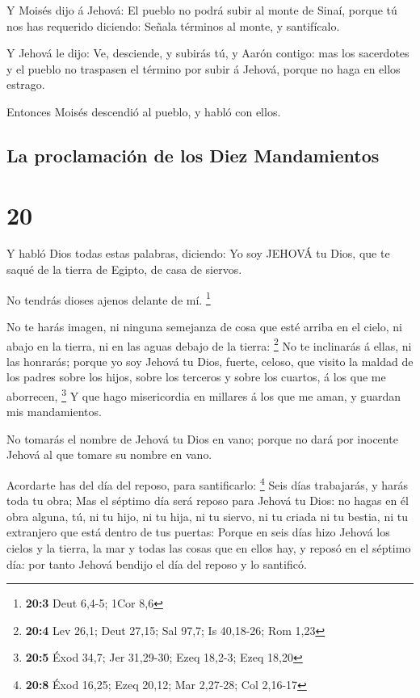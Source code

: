  Y Moisés dijo á Jehová: El pueblo no podrá subir al
monte de Sinaí, porque tú nos has requerido diciendo: Señala términos al
monte, y santifícalo.

 Y Jehová le dijo: Ve, desciende, y subirás tú, y Aarón
contigo: mas los sacerdotes y el pueblo no traspasen el término por
subir á Jehová, porque no haga en ellos estrago.

 Entonces Moisés descendió al pueblo, y habló con ellos.

\hypertarget{la-proclamaciuxf3n-de-los-diez-mandamientos}{%
\subsection{La proclamación de los Diez
Mandamientos}\label{la-proclamaciuxf3n-de-los-diez-mandamientos}}

\hypertarget{section-19}{%
\section{20}\label{section-19}}

 Y habló Dios todas estas palabras, diciendo:
 Yo soy JEHOVÁ tu Dios, que te saqué de la tierra de
Egipto, de casa de siervos.

 No tendrás dioses ajenos delante de mí. \footnote{\textbf{20:3}
  Deut 6,4-5; 1Cor 8,6}

 No te harás imagen, ni ninguna semejanza de cosa que esté
arriba en el cielo, ni abajo en la tierra, ni en las aguas debajo de la
tierra: \footnote{\textbf{20:4} Lev 26,1; Deut 27,15; Sal 97,7; Is
  40,18-26; Rom 1,23}  No te inclinarás á ellas, ni las
honrarás; porque yo soy Jehová tu Dios, fuerte, celoso, que visito la
maldad de los padres sobre los hijos, sobre los terceros y sobre los
cuartos, á los que me aborrecen, \footnote{\textbf{20:5} Éxod 34,7; Jer
  31,29-30; Ezeq 18,2-3; Ezeq 18,20}  Y que hago
misericordia en millares á los que me aman, y guardan mis mandamientos.

 No tomarás el nombre de Jehová tu Dios en vano; porque no
dará por inocente Jehová al que tomare su nombre en vano.

 Acordarte has del día del reposo, para santificarlo:
\footnote{\textbf{20:8} Éxod 16,25; Ezeq 20,12; Mar 2,27-28; Col 2,16-17}
 Seis días trabajarás, y harás toda tu obra;
 Mas el séptimo día será reposo para Jehová tu Dios: no
hagas en él obra alguna, tú, ni tu hijo, ni tu hija, ni tu siervo, ni tu
criada ni tu bestia, ni tu extranjero que está dentro de tus puertas:
 Porque en seis días hizo Jehová los cielos y la tierra,
la mar y todas las cosas que en ellos hay, y reposó en el séptimo día:
por tanto Jehová bendijo el día del reposo y lo santificó.

